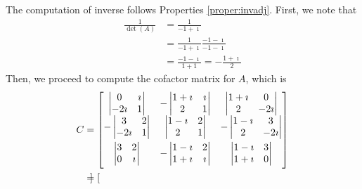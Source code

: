 \begin{solution}
The computation of inverse follows Properties \ref{proper:invadj}. First, we note that
\begin{align*}
\frac{1}{\det(A)} &= \frac{1}{-1+\imath} \\
&= \frac{1}{-1+\imath} \frac{-1-\imath}{-1-\imath} \\
&= \frac{-1-\imath}{1+1} = -\frac{1+\imath}{2}
\end{align*}
Then, we proceed to compute the cofactor matrix for $A$, which is
\begin{align*}
C &=
\begin{bmatrix}
\begin{vmatrix}
0 & \imath \\
-2\imath & 1
\end{vmatrix} &
-\begin{vmatrix}
1+\imath & \imath \\
2 & 1
\end{vmatrix} &
\begin{vmatrix}
1+\imath & 0 \\
2 & -2\imath
\end{vmatrix} \\
\vspace{3pt}
-\begin{vmatrix}
3 & 2 \\
-2\imath & 1
\end{vmatrix} &
\begin{vmatrix}
1-\imath & 2 \\
2 & 1
\end{vmatrix} &
-\begin{vmatrix}
1-\imath & 3 \\
2 & -2\imath
\end{vmatrix} \\
\vspace{3pt}
\begin{vmatrix}
3 & 2 \\
0 & \imath
\end{vmatrix} &
-\begin{vmatrix}
1-\imath & 2 \\
1+\imath & \imath
\end{vmatrix} &
\begin{vmatrix}
1-\imath & 3 \\
1+\imath & 0
\end{vmatrix}
\end{bmatrix} \\
&= 
\begin{bmatrix}

\end{bmatrix}
\end{align*}
\end{solution}
